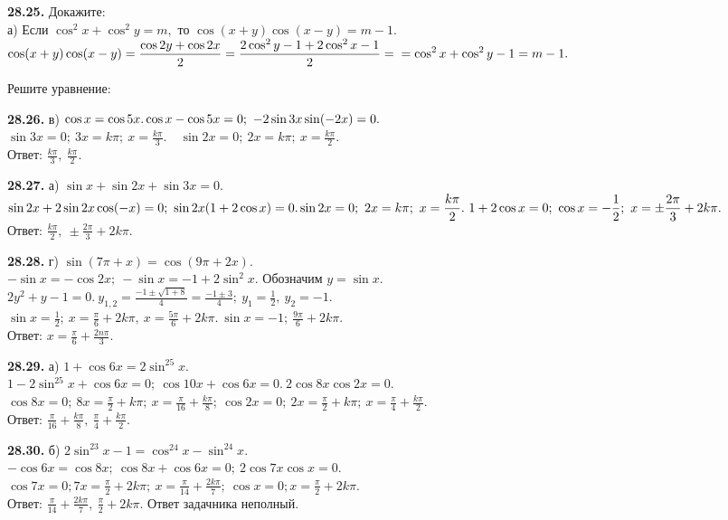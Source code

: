 \documentclass[a5paper,10pt]{article}
\begin{document}
\medskip
\noindent
{\bf 28.25.} Докажите:\\
а) Если $\cos^2x+\cos^2y=m,$ то $\cos(x+y)\cos(x-y)=m-1.$\\[3pt]
$\displaystyle \cos(x+y)\cos(x-y)=\frac{\cos2y+\cos2x}{2}=
\frac{2\cos^2y-1+2\cos^2x-1}{2}=\\
=\cos^2x+\cos^2y-1=m-1.$

\medskip
\noindent
Решите уравнение:

\medskip
\noindent
{\bf 28.26.}
в) $\cos x=\cos5x.\\
\cos x-\cos5x=0;\ -2\sin3x\sin(-2x)=0.$\\
$\displaystyle \sin3x=0;\ 3x=k\pi;\ x=\frac{k\pi}{3}.\quad \sin2x=0;\ 2x=k\pi;\ x=\frac{k\pi}{2}.$\\
Ответ: $\displaystyle \frac{k\pi}{3},\ \frac{k\pi}{2}.$

\medskip
\noindent
{\bf 28.27.}
а) $\sin x+\sin 2x+\sin 3x=0.$\\
$\displaystyle \sin 2x+2\sin2x\cos(-x)=0;\ \sin 2x(1+2\cos x)=0.\\
\sin2x=0;\ 2x=k\pi;\ x=\frac{k\pi}{2}.\ 
1+2\cos x=0;\ \cos x=-\frac12;\ x=\pm\frac{2\pi}{3}+2k\pi.$\\
Ответ: $\displaystyle \frac{k\pi}{2},\ \pm\frac{2\pi}{3}+2k\pi.$

\medskip
\noindent
{\bf 28.28.} г) $\sin(7\pi+x)=\cos(9\pi+2x).$\\
$-\sin x=-\cos2x;\ -\sin x=-1+2\sin^2x.$ Обозначим $y=\sin x$.\\[3pt]
$\displaystyle 2y^2+y-1=0.\ y_{1,2}=\frac{-1\pm\sqrt{1+8}}{4}=\frac{-1\pm3}{4};\ y_1=\frac12,\ y_2=-1.$\\[3pt]
$\displaystyle \sin x=\frac12;\ x=\frac{\pi}{6}+2k\pi,\ x=\frac{5\pi}{6}+2k\pi.\ \sin x=-1;\ \frac{9\pi}{6}+2k\pi.$\\[3pt]
Ответ: $\displaystyle x=\frac{\pi}{6}+\frac{2n\pi}{3}.$

\medskip
\noindent
{\bf 28.29.} а) $1+\cos6x=2\sin^25x.$\\[3pt]
$1-2\sin^25x+\cos6x=0;\ \cos10x+\cos6x=0.\ 2\cos8x\cos2x=0.$\\
$\displaystyle \cos8x=0;\ 8x=\frac{\pi}{2}+k\pi;\ x=\frac{\pi}{16}+\frac{k\pi}{8};
\ \cos2x=0;\ 2x=\frac{\pi}{2}+k\pi;\ x=\frac{\pi}{4}+\frac{k\pi}{2}.$\\
Ответ: $\displaystyle \frac{\pi}{16}+\frac{k\pi}{8},\ \frac{\pi}{4}+\frac{k\pi}{2}.$

\medskip
\noindent
{\bf 28.30.} б) $2\sin^23x-1=\cos^24x-\sin^24x.$\\[3pt]
$-\cos6x=\cos8x;\ \cos8x+\cos6x=0;\ 2\cos7x\cos x=0.$\\[3pt]
$\displaystyle \cos7x=0; 7x=\frac{\pi}{2}+2k\pi;\ x=\frac{\pi}{14}+\frac{2k\pi}{7};
\ \cos x=0; x=\frac{\pi}{2}+2k\pi.$\\[3pt]
Ответ: $\displaystyle \frac{\pi}{14}+\frac{2k\pi}{7},\ \frac{\pi}{2}+2k\pi.$
Ответ задачника неполный.
\end{document}
